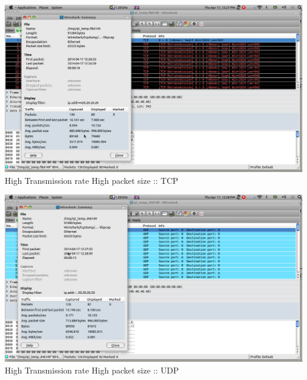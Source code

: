 \documentclass[a4paper,12pt,oneside]{article}
\begin{document}
\begin{center}
 
\includegraphics[width=13 cm,height=12 cm]{./tcphigh.png}
 High Transmission rate High packet size :: TCP 
\end{center}
 
\begin{center}
 
\includegraphics[width=13 cm,height=12 cm]{./udphigh.png}
 High Transmission rate High packet size :: UDP  
\end{center}
\end{document}
